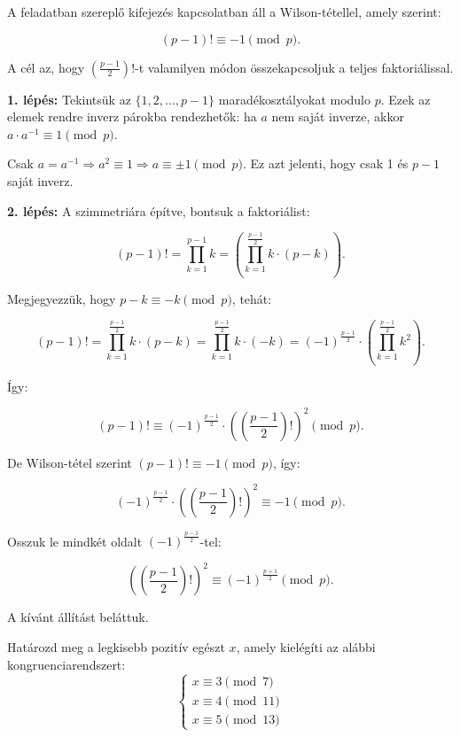 \begin{solution}
	A feladatban szereplő kifejezés kapcsolatban áll a Wilson-tétellel,
	amely szerint:
	
	\[
	(p-1)!\equiv-1\pmod p.
	\]
	
	A cél az, hogy $\left(\frac{p-1}{2}\right)!$-t valamilyen módon összekapcsoljuk
	a teljes faktoriálissal.
	
	\bigskip{}
	
	\textbf{1. lépés:} Tekintsük az $\{1,2,\dots,p-1\}$ maradékosztályokat
	modulo $p$. Ezek az elemek rendre inverz párokba rendezhetők: ha
	$a$ nem saját inverze, akkor $a\cdot a^{-1}\equiv1\pmod p$.
	
	Csak $a=a^{-1}\Rightarrow a^{2}\equiv1\Rightarrow a\equiv\pm1\pmod p$.
	Ez azt jelenti, hogy csak 1 és $p-1$ saját inverz.
	
	\bigskip{}
	
	\textbf{2. lépés:} A szimmetriára építve, bontsuk a faktoriálist:
	
	\[
	(p-1)!=\prod_{k=1}^{p-1}k=\left(\prod_{k=1}^{\frac{p-1}{2}}k\cdot(p-k)\right).
	\]
	
	Megjegyezzük, hogy $p-k\equiv-k\pmod p$, tehát:
	
	\[
	(p-1)!=\prod_{k=1}^{\frac{p-1}{2}}k\cdot(p-k)=\prod_{k=1}^{\frac{p-1}{2}}k\cdot(-k)=(-1)^{\frac{p-1}{2}}\cdot\left(\prod_{k=1}^{\frac{p-1}{2}}k^{2}\right).
	\]
	
	Így:
	
	\[
	(p-1)!\equiv(-1)^{\frac{p-1}{2}}\cdot\left(\left(\frac{p-1}{2}\right)!\right)^{2}\pmod p.
	\]
	
	De Wilson-tétel szerint $(p-1)!\equiv-1\pmod p$, így:
	
	\[
	(-1)^{\frac{p-1}{2}}\cdot\left(\left(\frac{p-1}{2}\right)!\right)^{2}\equiv-1\pmod p.
	\]
	
	Osszuk le mindkét oldalt $(-1)^{\frac{p-1}{2}}$-tel:
	
	\[
	\left(\left(\frac{p-1}{2}\right)!\right)^{2}\equiv(-1)^{\frac{p+1}{2}}\pmod p.
	\]
	
	A kívánt állítást beláttuk.
\end{solution}
\begin{extraproblem}
	Határozd meg a legkisebb pozitív egészt $x$, amely kielégíti az
	alábbi kongruenciarendszert: 
	\[
	\begin{cases}
		x\equiv3\pmod 7\\
		x\equiv4\pmod{11}\\
		x\equiv5\pmod{13}
	\end{cases}
	\]
\end{extraproblem}

